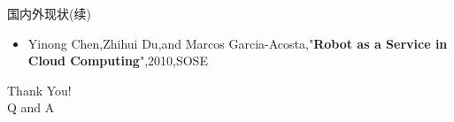 \documentclass[CJK]{beamer}
\begin{document}
\begin{CJK*}{UTF8}{gkai}
\begin{frame}{国内外现状(续)}
\begin{itemize}
\item Yinong Chen,Zhihui Du,and Marcos Garcia-Acosta,"{\bf Robot as a Service in Cloud Computing}",2010,SOSE
\end{itemize}
\end{frame}
\begin{frame}{}
\begin{block}{}
{\Large
\begin{center}
Thank You!\\
Q and A
\end{center}
}
\end{block}
\end{frame}
\end{CJK*}
\end{document}
